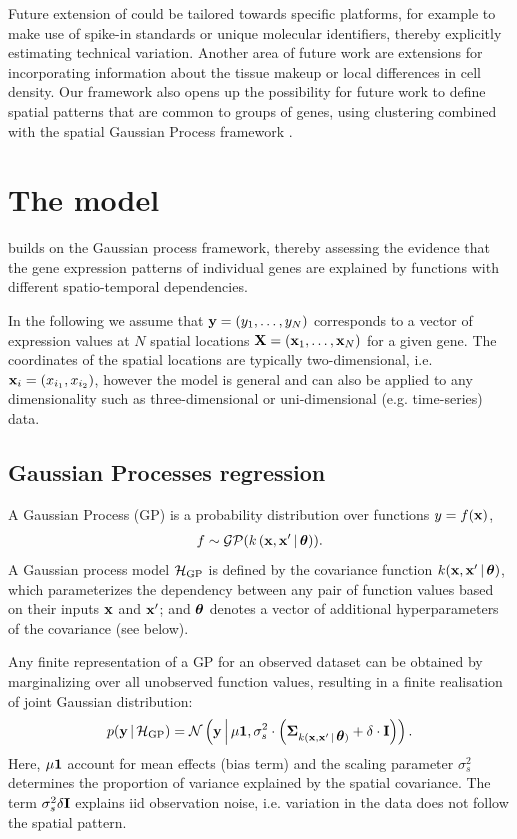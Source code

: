 Future extension of  could be tailored towards specific platforms, for example to make use of spike-in standards or unique molecular identifiers, thereby explicitly estimating technical variation. Another area of future work are extensions for incorporating information about the tissue makeup or local differences in cell density. Our framework also opens up the possibility for future work to define spatial patterns that are common to groups of genes, using clustering combined with the spatial Gaussian Process framework \cite{Hensman2015-op}.

\section{The  model}

 builds on the Gaussian process framework, thereby assessing the evidence that the gene expression patterns of individual genes are explained by functions with different spatio-temporal dependencies.

In the following we assume that $ {\bf y} = (y_1,\dots,y_N) $ corresponds to a vector of expression values at $N$ spatial locations $ {\bf X} = ({\bf x}_1,\dots,{\bf x}_N) $ for a given gene.  The coordinates of the spatial locations are typically two-dimensional, i.e. $ {\bf x}_i = (x_{i_1}, x_{i_2}) $, however the model is general and can also be applied to any dimensionality such as three-dimensional or uni-dimensional (e.g. time-series) data. 

\subsection{Gaussian Processes regression}

A Gaussian Process (GP) is a probability distribution over functions $ y = f({\bf x}) $,
\begin{align}
 f \sim \mathcal{GP}(k\left({\bf x},{\bf x}' \,|\, \mbox{\boldmath $\theta$}\right)). 
\end{align}
A Gaussian process model $ \mathcal{H}_{\text{GP}} $ is defined by the covariance function $ k({\bf x},{\bf x}' \,|\, \mbox{\boldmath $\theta$}) $, which parameterizes the dependency between any pair of function values based on their inputs $ {\bf x} $ and $ {\bf x}' $; and $ \mbox{\boldmath $\theta$} $ denotes a vector of additional hyperparameters of the covariance (see below). 

Any finite representation of a GP for an observed dataset can be obtained by marginalizing over all unobserved function values, resulting in a finite realisation of joint Gaussian distribution: 
\begin{align}
\label{eq:GP}
p({\bf y} \,|\, \mathcal{H}_{\text{GP}}) =  \mathcal{N}\left({\bf y} \,\middle | \, \mu {\bf 1}, \sigma_s^2 \cdot \left ( \mbox{\boldmath $\Sigma$}_{k({\bf x},{\bf x}'\,|\, \mbox{\boldmath $\theta$})} + \delta \cdot {\bf I} \right )\right).
\end{align}
Here, $ \mu \bf 1 $ account for mean effects (bias term) and the scaling parameter $ \sigma_s^2 $ determines the proportion of variance explained by the spatial covariance. The term $ \sigma_s^2 \delta {\bf I} $ explains iid observation noise, i.e. variation in the data does not follow the spatial pattern.

